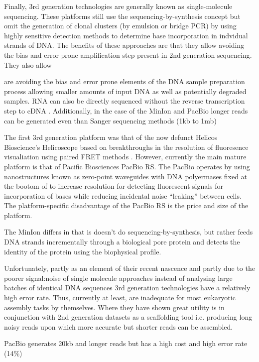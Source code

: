 Finally, 3rd generation technologies are generally known as single-molecule sequencing.
These platforms still use the sequencing-by-synthesis concept but omit the generation of
clonal clusters (by emulsion or bridge PCR) by using highly sensitive detection methods to
determine base incorporation in indvidual strands of DNA.
The benefits of these approaches are that they allow avoiding the bias and error prone 
amplification step present in 2nd generation sequencing.  They also allow 

are avoiding the bias and error prone elements of the DNA sample 
preparation process allowing smaller amounts of input DNA as well as potentially degraded samples.
RNA can also be directly sequenced without the reverse transcription step to cDNA \citep{Ozsolak2009}.
Additionally, in the case of the MinIon and PacBio longer reads can be generated even than Sanger
sequencing methods (1kb to 1mb) 

The first 3rd generation platform was that of the now defunct Helicos Bioscience's Helicoscope \citep{Harris2008}
based on breakthroughs in the resolution of fluoresence visualiation using paired FRET methods \citep{Braslavsky2003}.
However, currently the main mature platform is that of Pacific Biosciences PacBio RS.  The PacBio
operates by using nanostructures known as zero-point waveguides with DNA polyermases fixed
at the bootom of to increase resolution for detecting
fluorescent signals for incorporation of bases while reducing incidental noise ``leaking'' between 
cells.  The platform-specific disadvantage of the PacBio RS is the price and size of the platform.

The MinIon differs in that is doesn't do sequencing-by-synthesis, but rather feeds DNA strands incrementally
through a biological pore protein and detects the identity of the protein using the biophysical profile.

Unfortunately, partly as an element of their recent nascence and partly due to the
poorer signal:noise of single molecule approaches instead of analysing large 
batches of identical DNA sequences 3rd generation technologies have a relatively high error rate.
Thus, currently at least, are inadequate for most eukaryotic assembly tasks by themselves.
Where they have shown great utility is in conjunction with 2nd generation datasets
as a scaffolding tool i.e. producing long noisy reads upon which more accurate but shorter
reads can be assembled.

PacBio generates 20kb and longer reads but has a high cost and high error rate (14\%) \citep{Jaszczyszyn2014}



